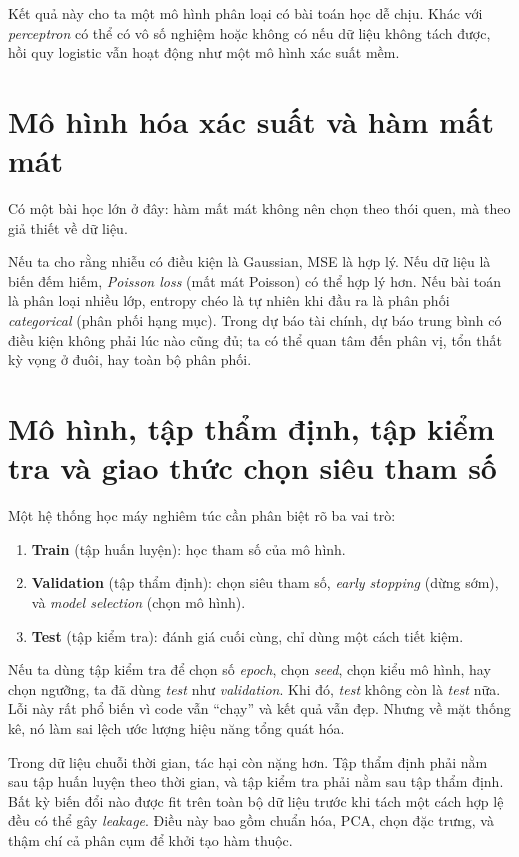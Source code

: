 Kết quả này cho ta một mô hình phân loại có bài toán học dễ chịu. Khác với \emph{perceptron} có thể có vô số nghiệm hoặc không có nếu dữ liệu không tách được, hồi quy logistic vẫn hoạt động như một mô hình xác suất mềm.

\section{Mô hình hóa xác suất và hàm mất mát}

Có một bài học lớn ở đây: hàm mất mát không nên chọn theo thói quen, mà theo giả thiết về dữ liệu.

Nếu ta cho rằng nhiễu có điều kiện là Gaussian, MSE là hợp lý. Nếu dữ liệu là biến đếm hiếm, \emph{Poisson loss} (mất mát Poisson) có thể hợp lý hơn. Nếu bài toán là phân loại nhiều lớp, entropy chéo là tự nhiên khi đầu ra là phân phối \emph{categorical} (phân phối hạng mục). Trong dự báo tài chính, dự báo trung bình có điều kiện không phải lúc nào cũng đủ; ta có thể quan tâm đến phân vị, tổn thất kỳ vọng ở đuôi, hay toàn bộ phân phối.

\section{Mô hình, tập thẩm định, tập kiểm tra và giao thức chọn siêu tham số}

Một hệ thống học máy nghiêm túc cần phân biệt rõ ba vai trò:

\begin{enumerate}
\item \textbf{Train} (tập huấn luyện): học tham số của mô hình.
\item \textbf{Validation} (tập thẩm định): chọn siêu tham số, \emph{early stopping} (dừng sớm), và \emph{model selection} (chọn mô hình).
\item \textbf{Test} (tập kiểm tra): đánh giá cuối cùng, chỉ dùng một cách tiết kiệm.
\end{enumerate}

Nếu ta dùng tập kiểm tra để chọn số \emph{epoch}, chọn \emph{seed}, chọn kiểu mô hình, hay chọn ngưỡng, ta đã dùng \emph{test} như \emph{validation}. Khi đó, \emph{test} không còn là \emph{test} nữa. Lỗi này rất phổ biến vì code vẫn ``chạy'' và kết quả vẫn đẹp. Nhưng về mặt thống kê, nó làm sai lệch ước lượng hiệu năng tổng quát hóa.

Trong dữ liệu chuỗi thời gian, tác hại còn nặng hơn. Tập thẩm định phải nằm sau tập huấn luyện theo thời gian, và tập kiểm tra phải nằm sau tập thẩm định. Bất kỳ biến đổi nào được fit trên toàn bộ dữ liệu trước khi tách một cách hợp lệ đều có thể gây \emph{leakage}. Điều này bao gồm chuẩn hóa, PCA, chọn đặc trưng, và thậm chí cả phân cụm để khởi tạo hàm thuộc.

